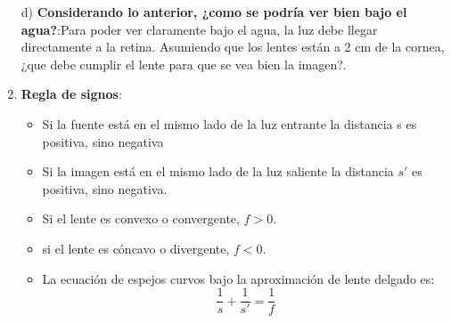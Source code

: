 \documentclass[letterpaper,11pt]{article}
\begin{document}
\begin{enumerate}
d) \textbf{Considerando lo anterior, ¿como se podría ver bien bajo el agua?}:Para poder ver claramente bajo el agua, la luz debe llegar directamente a la retina. Asumiendo que los lentes están a 2 cm de la cornea, ¿que debe cumplir el lente para que se vea bien la imagen?.


\item []

\textbf{Regla de signos}:
\begin{itemize} 
    \item Si la fuente está en el mismo lado de la luz entrante la distancia s es positiva, sino negativa
    \item Si la imagen está en el mismo lado de la luz saliente la distancia $s'$ es positiva, sino negativa.
    \item Si el lente es convexo o convergente, $f > 0$. 
    \item si el lente es cóncavo o divergente, $f < 0$.
    \item La ecuación de espejos curvos bajo la aproximación de lente delgado es:
    \begin{equation}
    \frac{1}{s}+\frac{1}{s'}=\frac{1}{f}
     \end{equation}
\end{itemize}

\end{enumerate}
\end{document}
